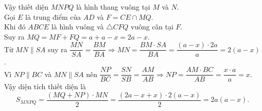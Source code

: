 \begin{ex}
{		Vậy thiết diện $MNPQ$ là hình thang vuông tại $M$ và $N$.\\ 
		Gọi $E$ là trung điểm của $AD$ và $F=CE\cap MQ$.\\
		Khi đó $ABCE$ là hình vuông và $\triangle CFQ$ vuông cân tại $F$.\\
		Suy ra $MQ=MF+FQ=a+a-x=2a-x$.\\
		Từ $MN\parallel SA$ suy ra $\dfrac{MN}{SA}=\dfrac{BM}{BA}\Rightarrow MN=\dfrac{BM\cdot SA}{BA}=\dfrac{(a-x)\cdot 2a}{a}=2(a-x)$.\\
		Vì $NP\parallel BC$ và $MN\parallel SA$ nên $\dfrac{NP}{BC}=\dfrac{SN}{SB}=\dfrac{AM}{AB}\Rightarrow NP=\dfrac{AM\cdot BC}{AB}=\dfrac{x\cdot a}{a}=x$.\\
		Vậy diện tích thiết diện là $$S_{MNPQ}=\dfrac{(MQ+NP)\cdot MN}{2}=\dfrac{(2a-x+x)\cdot 2(a-x)}{2}=2a(a-x).$$
	}
\end{ex}


